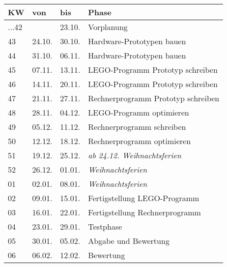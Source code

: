 \documentclass[a4paper,12pt]{article}
\begin{document}
\begin{center}
  \begin{tabular}{llll}
    \textbf{KW} & \textbf{von} & \textbf{bis} & \textbf{Phase}\\
    \hline
    ...42 &  & 23.10. & Vorplanung\\ 
    \hline
    43 & 24.10. & 30.10. & Hardware-Prototypen bauen \\
    \hline
    44 & 31.10. & 06.11. & Hardware-Prototypen bauen\\
    \hline
    45 & 07.11. & 13.11. & LEGO-Programm Prototyp schreiben\\
    \hline
    46 & 14.11. & 20.11. & LEGO-Programm Prototyp schreiben\\
    \hline
    47 & 21.11. & 27.11. & Rechnerprogramm Prototyp schreiben\\
    \hline
    48 & 28.11. & 04.12. & LEGO-Programm optimieren\\ 
    \hline
    49 & 05.12. & 11.12. & Rechnerprogramm schreiben\\
    \hline
    50 & 12.12. & 18.12. & Rechnerprogramm optimieren\\
    \hline
    51 & 19.12. & 25.12. & \emph{ab 24.12. Weihnachtsferien}\\
    \hline
    52 & 26.12. & 01.01. & \emph{Weihnachtsferien}\\
    \hline
    01 & 02.01. & 08.01. & \emph{Weihnachtsferien}\\
    \hline
    02 & 09.01. & 15.01. & Fertigstellung LEGO-Programm\\
    \hline
    03 & 16.01. & 22.01. & Fertigstellung Rechnerprogramm\\
    \hline
    04 & 23.01. & 29.01. & Testphase\\
    \hline
    05 & 30.01. & 05.02. & Abgabe und Bewertung\\
    \hline
    06 & 06.02. & 12.02. & Bewertung\\
    \hline
  \end{tabular}
\end{center}
\end{document}
